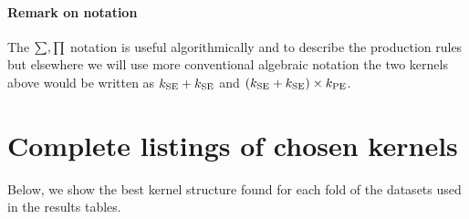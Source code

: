 \documentclass[twoside]{article}
\begin{document}
\paragraph{Remark on notation} The $\sum,\prod$ notation is useful algorithmically and to describe the production rules but elsewhere we will use more conventional algebraic notation \ie the two kernels above would be written as $k_\textrm{SE} + k_\textrm{SE}$ and ${(k_\textrm{SE} + k_\textrm{SE}) \times k_\textrm{PE}}$.






\section{Complete listings of chosen kernels}

Below, we show the best kernel structure found for each fold of the datasets used in the results tables.

%
%
%





\end{document}
